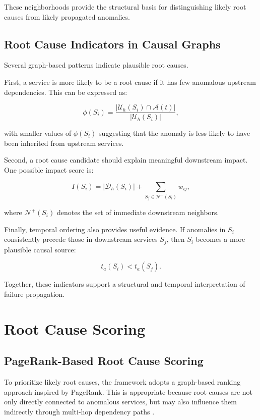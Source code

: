 These neighborhoods provide the structural basis for distinguishing likely root 
causes from likely propagated anomalies.

\subsection{Root Cause Indicators in Causal Graphs}
\label{subsec:rca_indicators}

Several graph-based patterns indicate plausible root causes.

First, a service is more likely to be a root cause if it has few anomalous 
upstream dependencies. This can be expressed as:

\[
\phi(S_i) = \frac{|\mathcal{U}_h(S_i) \cap \mathcal{A}(t)|}{|\mathcal{U}_h(S_i)|},
\]

with smaller values of $\phi(S_i)$ suggesting that the anomaly is less likely to 
have been inherited from upstream services.

Second, a root cause candidate should explain meaningful downstream impact. One 
possible impact score is:

\[
I(S_i) = |\mathcal{D}_h(S_i)| + \sum_{S_j \in \mathcal{N}^+(S_i)} w_{ij},
\]

where $\mathcal{N}^+(S_i)$ denotes the set of immediate downstream neighbors.

Finally, temporal ordering also provides useful evidence. If anomalies in $S_i$ 
consistently precede those in downstream services $S_j$, then $S_i$ becomes a 
more plausible causal source:

\[
t_a(S_i) < t_a(S_j).
\]

Together, these indicators support a structural and temporal interpretation of 
failure propagation.

\section{Root Cause Scoring}
\label{sec:rca_scoring}

\subsection{PageRank-Based Root Cause Scoring}
\label{subsec:rca_pagerank}

To prioritize likely root causes, the framework adopts a graph-based ranking 
approach inspired by PageRank. This is appropriate because root causes are not 
only directly connected to anomalous services, but may also influence them 
indirectly through multi-hop dependency paths \cite{brin1998anatomy, fu2020root}.


